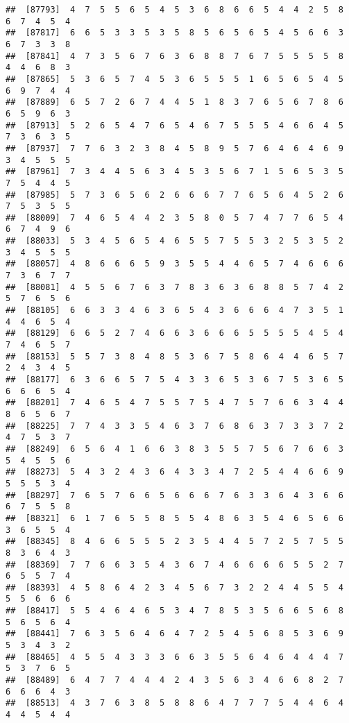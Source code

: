 \documentclass[
]{book}
\begin{document}
\begin{verbatim}
##  [87793]  4  7  5  5  6  5  4  5  3  6  8  6  6  5  4  4  2  5  8  6  7  4  5  4
##  [87817]  6  6  5  3  3  5  3  5  8  5  6  5  6  5  4  5  6  6  3  6  7  3  3  8
##  [87841]  4  7  3  5  6  7  6  3  6  8  8  7  6  7  5  5  5  5  8  4  4  6  8  3
##  [87865]  5  3  6  5  7  4  5  3  6  5  5  5  1  6  5  6  5  4  5  6  9  7  4  4
##  [87889]  6  5  7  2  6  7  4  4  5  1  8  3  7  6  5  6  7  8  6  6  5  9  6  3
##  [87913]  5  2  6  5  4  7  6  5  4  6  7  5  5  5  4  6  6  4  5  7  3  6  3  5
##  [87937]  7  7  6  3  2  3  8  4  5  8  9  5  7  6  4  6  4  6  9  3  4  5  5  5
##  [87961]  7  3  4  4  5  6  3  4  5  3  5  6  7  1  5  6  5  3  5  7  5  4  4  5
##  [87985]  5  7  3  6  5  6  2  6  6  6  7  7  6  5  6  4  5  2  6  7  5  3  5  5
##  [88009]  7  4  6  5  4  4  2  3  5  8  0  5  7  4  7  7  6  5  4  6  7  4  9  6
##  [88033]  5  3  4  5  6  5  4  6  5  5  7  5  5  3  2  5  3  5  2  3  4  5  5  5
##  [88057]  4  8  6  6  6  5  9  3  5  5  4  4  6  5  7  4  6  6  6  7  3  6  7  7
##  [88081]  4  5  5  6  7  6  3  7  8  3  6  3  6  8  8  5  7  4  2  5  7  6  5  6
##  [88105]  6  6  3  3  4  6  3  6  5  4  3  6  6  6  4  7  3  5  1  4  4  6  5  4
##  [88129]  6  6  5  2  7  4  6  6  3  6  6  6  5  5  5  5  4  5  4  7  4  6  5  7
##  [88153]  5  5  7  3  8  4  8  5  3  6  7  5  8  6  4  4  6  5  7  2  4  3  4  5
##  [88177]  6  3  6  6  5  7  5  4  3  3  6  5  3  6  7  5  3  6  5  6  6  6  5  4
##  [88201]  7  4  6  5  4  7  5  5  7  5  4  7  5  7  6  6  3  4  4  8  6  5  6  7
##  [88225]  7  7  4  3  3  5  4  6  3  7  6  8  6  3  7  3  3  7  2  4  7  5  3  7
##  [88249]  6  5  6  4  1  6  6  3  8  3  5  5  7  5  6  7  6  6  3  5  4  5  5  6
##  [88273]  5  4  3  2  4  3  6  4  3  3  4  7  2  5  4  4  6  6  9  5  5  5  3  4
##  [88297]  7  6  5  7  6  6  5  6  6  6  7  6  3  3  6  4  3  6  6  6  7  5  5  8
##  [88321]  6  1  7  6  5  5  8  5  5  4  8  6  3  5  4  6  5  6  6  3  6  5  5  4
##  [88345]  8  4  6  6  5  5  5  2  3  5  4  4  5  7  2  5  7  5  5  8  3  6  4  3
##  [88369]  7  7  6  6  3  5  4  3  6  7  4  6  6  6  6  5  5  2  7  6  5  5  7  4
##  [88393]  4  5  8  6  4  2  3  4  5  6  7  3  2  2  4  4  5  5  4  5  5  6  6  6
##  [88417]  5  5  4  6  4  6  5  3  4  7  8  5  3  5  6  6  5  6  8  5  6  5  6  4
##  [88441]  7  6  3  5  6  4  6  4  7  2  5  4  5  6  8  5  3  6  9  5  3  4  3  2
##  [88465]  4  5  5  4  3  3  3  6  6  3  5  5  6  4  6  4  4  4  7  5  3  7  6  5
##  [88489]  6  4  7  7  4  4  4  2  4  3  5  6  3  4  6  6  8  2  7  6  6  6  4  3
##  [88513]  4  3  7  6  3  8  5  8  8  6  4  7  7  7  5  4  4  6  4  4  4  5  4  4

\end{verbatim}
\end{document}
